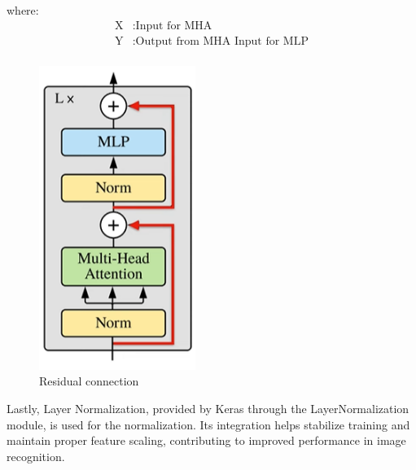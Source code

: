 \noindent where:
\begin{align*}
    \text{X} & : \text{Input for MHA}                 \\
    \text{Y} & : \text{Output from MHA Input for MLP} \\
\end{align*}
\begin{figure}[htbp]
    \centering
    \includegraphics[width=2in]{img/residual connection.png}
    \caption{{Residual connection}}
\end{figure}

\noindent Lastly, Layer Normalization, provided by Keras through the LayerNormalization module, is used for the normalization. Its integration helps stabilize training and maintain proper feature scaling, contributing to improved performance in image recognition.

\newpage